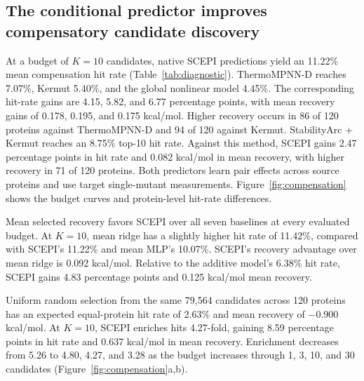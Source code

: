 \documentclass{llncs}
\begin{document}
\subsection{The conditional predictor improves compensatory candidate discovery}

At a budget of $K=10$ candidates, native SCEPI predictions yield an 11.22\% mean compensation hit rate (Table~\ref{tab:diagnostic}). ThermoMPNN-D reaches 7.07\%, Kermut 5.40\%, and the global nonlinear model 4.45\%. The corresponding hit-rate gains are 4.15, 5.82, and 6.77 percentage points, with mean recovery gains of 0.178, 0.195, and 0.175 kcal/mol. Higher recovery occurs in 86 of 120 proteins against ThermoMPNN-D and 94 of 120 against Kermut. StabilityArc + Kermut reaches an 8.75\% top-10 hit rate. Against this method, SCEPI gains 2.47 percentage points in hit rate and 0.082 kcal/mol in mean recovery, with higher recovery in 71 of 120 proteins. Both predictors learn pair effects across source proteins and use target single-mutant measurements. Figure~\ref{fig:compensation} shows the budget curves and protein-level hit-rate differences.

Mean selected recovery favors SCEPI over all seven baselines at every evaluated budget. At $K=10$, mean ridge has a slightly higher hit rate of 11.42\%, compared with SCEPI's 11.22\% and mean MLP's 10.07\%. SCEPI's recovery advantage over mean ridge is 0.092 kcal/mol. Relative to the additive model's 6.38\% hit rate, SCEPI gains 4.83 percentage points and 0.125 kcal/mol mean recovery.

Uniform random selection from the same 79,564 candidates across 120 proteins has an expected equal-protein hit rate of 2.63\% and mean recovery of $-0.900$ kcal/mol. At $K=10$, SCEPI enriches hits 4.27-fold, gaining 8.59 percentage points in hit rate and 0.637 kcal/mol in mean recovery. Enrichment decreases from 5.26 to 4.80, 4.27, and 3.28 as the budget increases through 1, 3, 10, and 30 candidates (Figure~\ref{fig:compensation}a,b).
\end{document}
